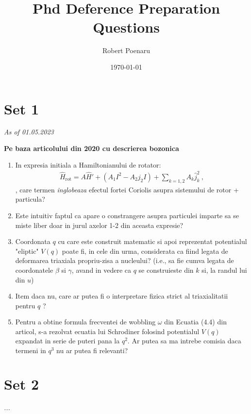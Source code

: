\documentclass[a4paper,12pt]{article}
\author{Robert Poenaru}
\date{\today}
\title{Phd Deference Preparation\\Questions}
\begin{document}
\maketitle

\tableofcontents

\section{Set 1}

\begin{center}
    \textit{As of 01.05.2023}
\end{center}

\begin{center}
\textbf{Pe baza articolului din 2020 cu descrierea bozonica}
\end{center}

\begin{enumerate}
    \item In expresia initiala a Hamiltonianului de rotator:
    \begin{align}
        \hat{H}_\text{rot}=A\hat{H}'+(A_1I^2-A_2j_2I)+\sum_{k=1,2}A_k\hat{j}_k^2\ ,
    \end{align}
    , care termen \emph{inglobeaza} efectul fortei Coriolis asupra sistemului de rotor + particula?
    \item Este intuitiv faptul ca apare o constrangere asupra particulei imparte sa se miste liber doar in jurul axelor 1-2 din aceasta expresie?
    \item Coordonata $q$ cu care este construit matematic si apoi reprezentat potentialul "eliptic" $V(q)$ poate fi, in cele din urma, considerata ca fiind legata de deformarea triaxiala propriu-zisa a nucleului? (i.e., sa fie cumva legata de coordonatele $\beta$ si $\gamma$, avand in vedere ca $q$ se construieste din $k$ si, la randul lui din $u$)
    \item Item daca nu, care ar putea fi o interpretare fizica strict al triaxialitatii pentru $q$ ?
    \item Pentru a obtine formula frecventei de wobbling $\omega$ din Ecuatia (4.4) din articol, s-a rezolvat ecuatia lui Schrodiner folosind potentialul $V(q)$ expandat in serie de puteri pana la $q^2$. Ar putea sa ma intrebe comisia daca termeni in $q^3$ nu ar putea fi relevanti?
\end{enumerate}


\section{Set 2}
\textit{...}
\end{document}

